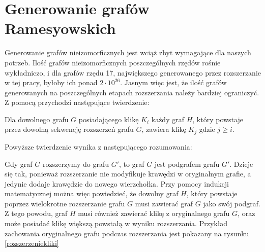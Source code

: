 \section{Generowanie grafów Ramesyowskich}

Generowanie grafów nieizomorficznych jest wciąż zbyt wymagające dla naszych potrzeb. Ilość grafów nieizomorficznych poszczególnych rzędów rośnie wykładniczo, i dla grafów rzędu 17, największego generowanego przez rozszerzanie w tej pracy, byłoby ich ponad $2 \cdot 10^{26}$\cite{OEIS}. Jasnym więc jest, że ilość grafów generowanych na poszczególnych etapach rozszerzania należy bardziej ograniczyć. Z pomocą przychodzi następujące twierdzenie: 


\begin{theorem}
	Dla dowolnego grafu $G$ posiadającego klikę $K_i$ każdy graf $H$, który powstaje przez dowolną sekwencję rozszerzeń grafu $G$, zawiera klikę $K_j$ gdzie $j \geq i$.
\end{theorem}


Powyższe twierdzenie wynika z  następującego rozumowania:

 Gdy graf $G$ rozszerzymy do grafu $G'$, to graf $G$ jest podgrafem grafu $G'$. Dzieje się tak, ponieważ rozszerzanie nie modyfikuje krawędzi w oryginalnym grafie, a jedynie dodaje krawędzie do nowego wierzchołka. Przy pomocy indukcji matematycznej można więc powiedzieć, że dowolny graf $H$, który powstaje poprzez wielokrotne rozszerzanie grafu $G$ musi zawierać graf $G$ jako swój podgraf. Z tego powodu, graf $H$ musi również zawierać klikę z oryginalnego grafu $G$, oraz może posiadać klikę większą powstałą w wyniku rozszerzania. Przykład zachowania oryginalnego grafu podczas rozszerzania jest pokazany na rysunku \ref{rozszerzeniekliki}

